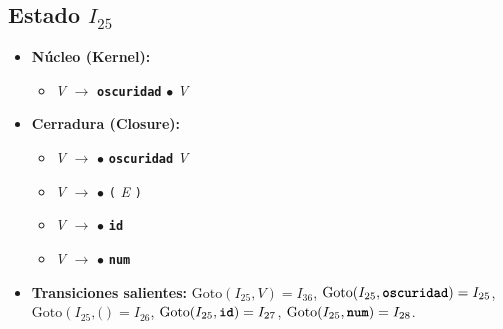 \documentclass[12pt, letterpaper]{article}
\begin{document}
\subsection*{Estado $I_{25}$ }
\begin{itemize}\setlength{\itemsep}{1pt}\setlength{\parskip}{0pt}
\item \textbf{Núcleo (Kernel):}
\begin{itemize}\setlength{\itemsep}{1pt}\setlength{\parskip}{0pt}
    \item \textit{V} $\to$ \textbf{\texttt{oscuridad}} $\bullet$ \textit{V}
\end{itemize}
\item \textbf{Cerradura (Closure):}
\begin{itemize}\setlength{\itemsep}{1pt}\setlength{\parskip}{0pt}
    \item \textit{V} $\to$ $\bullet$ \textbf{\texttt{oscuridad}} \textit{V}
    \item \textit{V} $\to$ $\bullet$ \texttt{(} \textit{E} \texttt{)}
    \item \textit{V} $\to$ $\bullet$ \textbf{\texttt{id}}
    \item \textit{V} $\to$ $\bullet$ \textbf{\texttt{num}}
\end{itemize}
\item \textbf{Transiciones salientes:} $\text{Goto}(I_{25}, \textit{V}) = I_{36}$, \quad $\text{Goto}(I_{25}, \textbf{\texttt{oscuridad}}) = I_{25}$, \quad $\text{Goto}(I_{25}, \texttt{(}) = I_{26}$, \quad $\text{Goto}(I_{25}, \textbf{\texttt{id}}) = I_{27}$, \quad $\text{Goto}(I_{25}, \textbf{\texttt{num}}) = I_{28}$.
\end{itemize}
\vspace{2pt}
\end{document}
